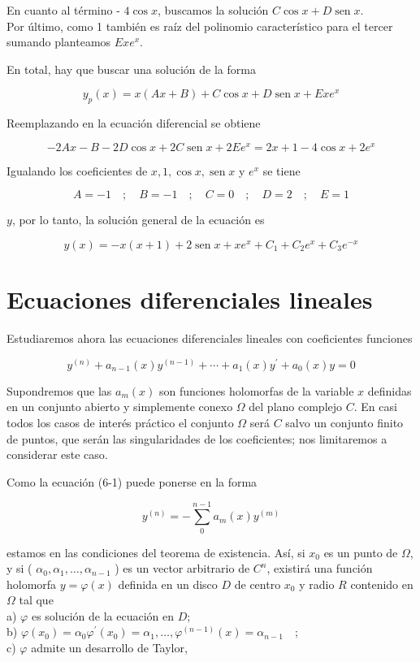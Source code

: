 \documentclass[10pt]{article}
\theoremstyle{plain}
\theoremstyle{definition}
\theoremstyle{remark}
\begin{document}
En cuanto al término - $4 \cos x$, buscamos la solución $C \cos x+D \operatorname{sen} x$.\\
Por último, como 1 también es raíz del polinomio característico para el tercer sumando planteamos $E x e^{x}$.

En total, hay que buscar una solución de la forma

$$
y_{p}(x)=x(A x+B)+C \cos x+D \operatorname{sen} x+E x e^{x}
$$

Reemplazando en la ecuación diferencial se obtiene

$$
-2 A x-B-2 D \cos x+2 C \operatorname{sen} x+2 E e^{x}=2 x+1-4 \cos x+2 e^{x}
$$

Igualando los coeficientes de $x, 1, \cos x, \operatorname{sen} x$ y $e^{x}$ se tiene

$$
A=-1 \quad ; \quad B=-1 \quad ; \quad C=0 \quad ; \quad D=2 \quad ; \quad E=1
$$

$y$, por lo tanto, la solución general de la ecuación es

$$
y(x)=-x(x+1)+2 \operatorname{sen} x+x e^{x}+C_{1}+C_{2} e^{x}+C_{3} e^{-x}
$$

\section{Ecuaciones diferenciales lineales}
Estudiaremos ahora las ecuaciones diferenciales lineales con coeficientes funciones


\begin{equation*}
y^{(n)}+a_{n-1}(x) y^{(n-1)}+\cdots+a_{1}(x) y^{\prime}+a_{0}(x) y=0 \tag{6-1}
\end{equation*}


Supondremos que las $a_{m}(x)$ son funciones holomorfas de la variable $x$ definidas en un conjunto abierto y simplemente conexo $\Omega$ del plano complejo $C$. En casi todos los casos de interés práctico el conjunto $\Omega$ será $C$ salvo un conjunto finito de puntos, que serán las singularidades de los coeficientes; nos limitaremos a considerar este caso.

Como la ecuación (6-1) puede ponerse en la forma


\begin{equation*}
y^{(n)}=-\sum_{0}^{n-1} a_{m}(x) y^{(m)} \tag{6-1}
\end{equation*}


estamos en las condiciones del teorema de existencia. Así, si $x_{0}$ es un punto de $\Omega$, y si ( $\alpha_{0}, \alpha_{1}, \ldots, \alpha_{n-1}$ ) es un vector arbitrario de $C^{n}$, existirá una función holomorfa $y=\varphi(x)$ definida en un disco $D$ de centro $x_{0}$ y radio $R$ contenido en $\Omega$ tal que\\
a) $\varphi$ es solución de la ecuación en $D$;\\
b) $\varphi\left(x_{0}\right)=\alpha_{0} \varphi^{\prime}\left(x_{0}\right)=\alpha_{1}, \ldots, \varphi^{(n-1)}(x)=\alpha_{n-1} \quad$;\\
c) $\varphi$ admite un desarrollo de Taylor,
\end{document}
